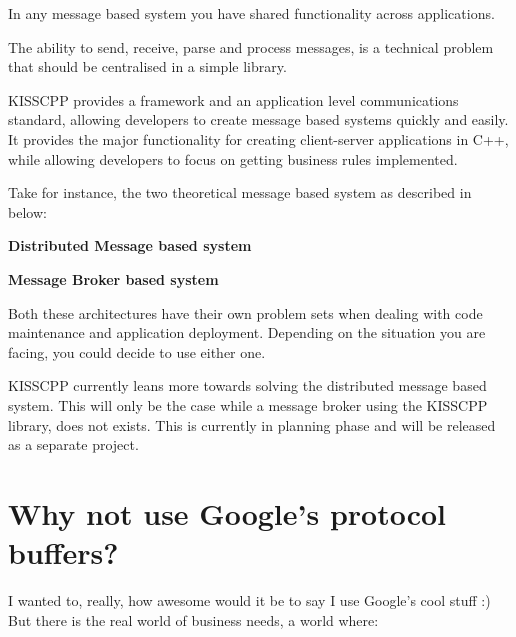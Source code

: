 In any message based system you have shared functionality across applications.

The ability to send, receive, parse and process messages, is a technical problem that should be centralised in a simple library.

K\-I\-S\-S\-C\-P\-P provides a framework and an application level communications standard, allowing developers to create message based systems quickly and easily. It provides the major functionality for creating client-\/server applications in C++, while allowing developers to focus on getting business rules implemented.

Take for instance, the two theoretical message based system as described in below\-:


\begin{DoxyEnumerate}
\item {\bfseries Distributed Message based system} 
\item {\bfseries Message Broker based system} 
\end{DoxyEnumerate}

Both these architectures have their own problem sets when dealing with code maintenance and application deployment. Depending on the situation you are facing, you could decide to use either one.

K\-I\-S\-S\-C\-P\-P currently leans more towards solving the distributed message based system. This will only be the case while a message broker using the K\-I\-S\-S\-C\-P\-P library, does not exists. This is currently in planning phase and will be released as a separate project.

\section*{Why not use Google's protocol buffers?}

I wanted to, really, how awesome would it be to say I use Google's cool stuff \-:) But there is the real world of business needs, a world where\-:


